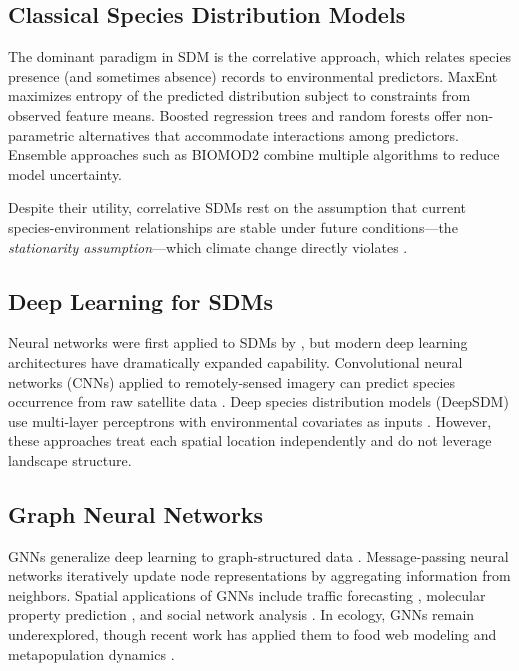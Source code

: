 \documentclass[11pt,a4paper]{article}
\begin{document}
\subsection{Classical Species Distribution Models}

The dominant paradigm in SDM is the correlative approach, which relates
species presence (and sometimes absence) records to environmental
predictors. MaxEnt \citep{phillips2006maximum} maximizes entropy of the
predicted distribution subject to constraints from observed feature
means. Boosted regression trees \citep{elith2008working} and random
forests \citep{cutler2007random} offer non-parametric alternatives that
accommodate interactions among predictors. Ensemble approaches such as
BIOMOD2 \citep{thuiller2009biomod} combine multiple algorithms to reduce
model uncertainty.

Despite their utility, correlative SDMs rest on the assumption that
current species-environment relationships are stable under future
conditions---the \emph{stationarity assumption}---which climate change
directly violates \citep{dormann2012correlation}.

\subsection{Deep Learning for SDMs}

Neural networks were first applied to SDMs by \citet{lek1996application},
but modern deep learning architectures have dramatically expanded
capability. Convolutional neural networks (CNNs) applied to
remotely-sensed imagery can predict species occurrence from raw satellite
data \citep{deneu2021convolutional}. Deep species distribution models
(DeepSDM) use multi-layer perceptrons with environmental covariates as
inputs \citep{botella2018deep}. However, these approaches treat each
spatial location independently and do not leverage landscape structure.

\subsection{Graph Neural Networks}

GNNs generalize deep learning to graph-structured data
\citep{kipf2017semi, velickovic2018graph}. Message-passing neural
networks \citep{gilmer2017neural} iteratively update node representations
by aggregating information from neighbors. Spatial applications of GNNs
include traffic forecasting \citep{li2018diffusion}, molecular property
prediction \citep{duvenaud2015convolutional}, and social network analysis
\citep{hamilton2017inductive}. In ecology, GNNs remain underexplored,
though recent work has applied them to food web modeling
\citep{strydom2021graph} and metapopulation dynamics
\citep{mcinerny2022graph}.
\end{document}
